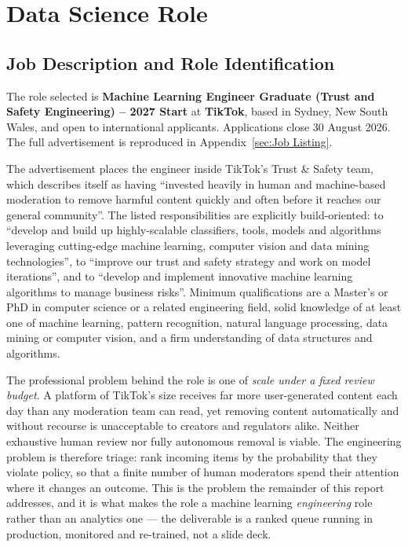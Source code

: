 ﻿%
\section{Data Science Role}
\label{sec:Data Science Role}

\subsection{Job Description and Role Identification}
\label{subsec:Job Description and Role Identification}

The role selected is \textbf{Machine Learning Engineer Graduate (Trust and Safety
Engineering) -- 2027 Start} at \textbf{TikTok}, based in Sydney, New South Wales, and
open to international applicants. Applications close 30 August 2026. The full
advertisement is reproduced in Appendix~\ref{sec:Job Listing}.

The advertisement places the engineer inside TikTok's Trust \& Safety team, which
describes itself as having ``invested heavily in human and machine-based moderation to
remove harmful content quickly and often before it reaches our general community''. The
listed responsibilities are explicitly build-oriented: to ``develop and build up
highly-scalable classifiers, tools, models and algorithms leveraging cutting-edge machine
learning, computer vision and data mining technologies'', to ``improve our trust and
safety strategy and work on model iterations'', and to ``develop and implement innovative
machine learning algorithms to manage business risks''. Minimum qualifications are a
Master's or PhD in computer science or a related engineering field, solid knowledge of at
least one of machine learning, pattern recognition, natural language processing, data
mining or computer vision, and a firm understanding of data structures and algorithms.

The professional problem behind the role is one of \emph{scale under a fixed review
budget}. A platform of TikTok's size receives far more user-generated content each day
than any moderation team can read, yet removing content automatically and without recourse
is unacceptable to creators and regulators alike. Neither exhaustive human review nor
fully autonomous removal is viable. The engineering problem is therefore triage: rank
incoming items by the probability that they violate policy, so that a finite number of
human moderators spend their attention where it changes an outcome. This is the problem
the remainder of this report addresses, and it is what makes the role a machine learning
\emph{engineering} role rather than an analytics one --- the deliverable is a ranked queue
running in production, monitored and re-trained, not a slide deck.

